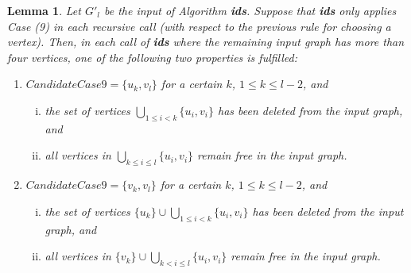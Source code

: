 \documentclass[a4paper,10pt]{article}
\theoremstyle{plain}
\newtheorem{lemma}[theorem]{Lemma}
\theoremstyle{definition}
\theoremstyle{remark}
\begin{document}
\begin{lemma}\label{LBLemma1}
Let $G'_l$ be the input of Algorithm {\bf ids}.
Suppose that {\bf ids} only applies Case (9) in each recursive call
(with respect to the previous rule for choosing a vertex).
Then, in each call of {\bf ids} where the remaining input graph has more
than four vertices, one of the following two properties is fulfilled:

\begin{enumerate}[(1)]
\item $CandidateCase9 = \{ u_k, v_l \}$ for a certain $k$, $1\leq k \leq l-2$, and
\begin{enumerate}[(i)]
\item the set of vertices $\bigcup_{1\leq i<k} \{u_i,v_i\}$ has been deleted from
the input graph, and
\item all vertices in $\bigcup_{k\leq i\leq l} \{u_i,v_i\}$ remain free in
the input graph.
\end{enumerate}

\item $CandidateCase9 = \{ v_k, v_l \}$ for a certain $k$, $1\leq k \leq l-2$, and
\begin{enumerate}[(i)]
\item the set of vertices $\{u_k \} \cup \bigcup_{1\leq i<k} \{u_i,v_i\}$ has
been deleted from the input graph, and
\item all vertices in $\{v_k \} \cup \bigcup_{k< i\leq l} \{u_i,v_i\}$ remain
free in the input graph.
\end{enumerate}
\end{enumerate}
\end{lemma}
\end{document}

